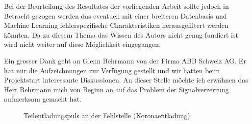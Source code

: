 \begin{refsection}
Bei der Beurteilung des Resultates der vorliegenden Arbeit sollte jedoch in Betracht gezogen werden das eventuell mit einer breiteren Datenbasis und Machine Learning fehlerspezifische Charakteristiken herausgefiltert werden könnten. 
Da zu diesem Thema das Wissen des Autors nicht genug fundiert ist wird nicht weiter auf diese Möglichkeit eingegangen.

Ein grosser Dank geht an Glenn Behrmann von der Firma ABB Schweiz AG. 
Er hat mir die Aufzeichnungen zur Verfügung gestellt und wir hatten beim Projektstart interessante Diskussionen. An dieser Stelle möchte ich erwähnen das Herr Behrmann mich von Beginn an auf das Problem der Signalverzerrung aufmerksam gemacht hat.

\begin{figure}
	\centering
    \caption{Teilentladungspuls an der Fehlstelle (Koronaentladung) \cite{skript:Judd24ps}}
	\label{fig:Teilentaldungspuls}
\end{figure}

\printbibliography[heading=subbibliography]
\end{refsection}
